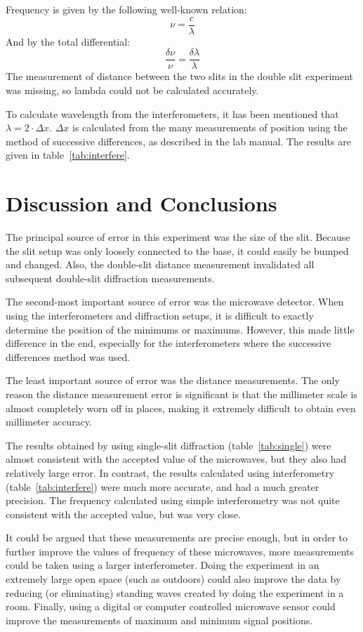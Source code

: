 \documentclass[letterpaper]{article}
\begin{document}


Frequency is given by the following well-known relation:
\[
\nu = \frac{c}{\lambda}
\]
And by the total differential:
\[
\frac{\delta\nu}{\nu} = \frac{\delta\lambda}{\lambda}
\]
The measurement of distance between the two slits in the double slit experiment was missing, so lambda could not be calculated accurately.

To calculate wavelength from the interferometers, it has been mentioned that $\lambda = 2\cdot\Delta x$. $\Delta x$ is calculated from the many measurements of position using the method of successive differences, as described in the lab manual. The results are given in table~\ref{tab:interfere}.




\section{Discussion and Conclusions}
The principal source of error in this experiment was the size of the slit. Because the slit setup was only loosely connected to the base, it could easily be bumped and changed. Also, the double-slit distance measurement invalidated all subsequent double-slit diffraction measurements.

The second-most important source of error was the microwave detector. When using the interferometers and diffraction setups, it is difficult to exactly determine the position of the minimums or maximums. However, this made little difference in the end, especially for the interferometers where the successive differences method was used.

The least important source of error was the distance measurements. The only reason the distance measurement error is significant is that the millimeter scale is almost completely worn off in places, making it extremely difficult to obtain even millimeter accuracy.

The results obtained by using single-slit diffraction (table~\ref{tab:single}) were almost consistent with the accepted value of the microwaves, but they also had relatively large error. In contrast, the results calculated using interferometry (table~\ref{tab:interfere}) were much more accurate, and had a much greater precision. The frequency calculated using simple interferometry was not quite consistent with the accepted value, but was very close.

It could be argued that these measurements are precise enough, but in order to further improve the values of frequency of these microwaves, more measurements could be taken using a larger interferometer. Doing the experiment in an extremely large open space (such as outdoors) could also improve the data by reducing (or eliminating) standing waves created by doing the experiment in a room. Finally, using a digital or computer controlled microwave sensor could improve the measurements of maximum and minimum signal positions.

\end{document}
